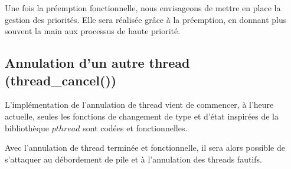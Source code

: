 Une fois la préemption fonctionnelle, nous envisageons de mettre en place la
gestion des priorités. Elle sera réalisée grâce à la préemption, en donnant
plus souvent la main aux processus de haute priorité.
 
\subsection{Annulation d'un autre thread (thread\_cancel())}

L'implémentation de l'annulation de thread vient de commencer, à l'heure
actuelle, seules les fonctions de changement de type et d'état inspirées de la
bibliothèque $pthread$ sont codées et fonctionnelles.

Avec l'annulation de thread terminée et fonctionnelle, il sera alors possible
de s'attaquer au débordement de pile et à l'annulation des threads fautifs.
